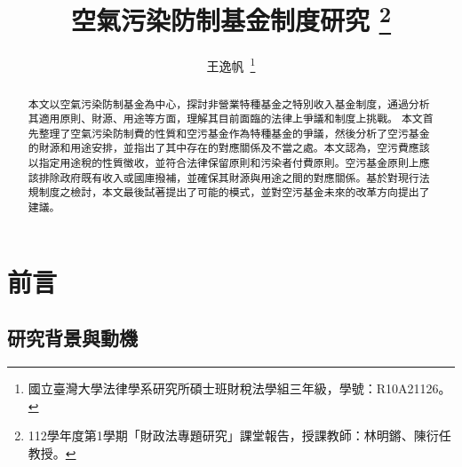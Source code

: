 \documentclass[12pt,a4paper]{article}
\author{王逸帆\,
\thanks{國立臺灣大學法律學系研究所碩士班財稅法學組三年級，學號：R10A21126。}
\vspace{-60em}
}
\date{}
\title{空氣污染防制基金制度研究
\thanks{
  112學年度第1學期「財政法專題研究」課堂報告，授課教師：林明鏘、陳衍任教授。}}
\begin{document}
\maketitle
\makeatother

\vspace{1pt}

\begin{abstract}
\setlength{\parindent}{2em}
\noindent
\hspace*{0.9\parindent}


本文以空氣污染防制基金為中心，探討非營業特種基金之特別收入基金制度，通過分析其適用原則、財源、用途等方面，理解其目前面臨的法律上爭議和制度上挑戰。
本文首先整理了空氣污染防制費的性質和空污基金作為特種基金的爭議，然後分析了空污基金的財源和用途安排，並指出了其中存在的對應關係及不當之處。本文認為，空污費應該以指定用途稅的性質徵收，並符合法律保留原則和污染者付費原則。空污基金原則上應該排除政府既有收入或國庫撥補，並確保其財源與用途之間的對應關係。基於對現行法規制度之檢討，本文最後試著提出了可能的模式，並對空污基金未來的改革方向提出了建議。

   \end{abstract}



\thispagestyle{empty} %






\clearpage


\tableofcontents 

\thispagestyle{empty} %

\clearpage
\listoffigures
\listoftables


\thispagestyle{empty} %
\clearpage

\restoregeometry

\setcounter{page}{1} %

\section{前言}
\subsection{研究背景與動機}
\end{document}
